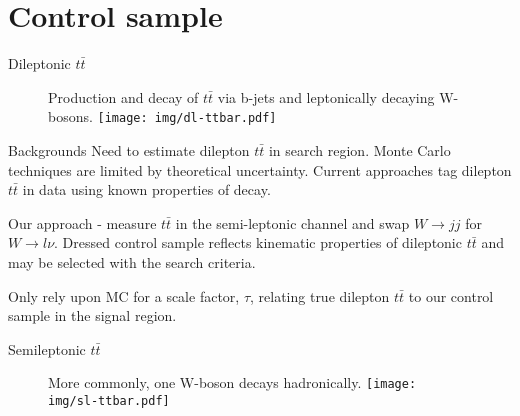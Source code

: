 \documentclass{beamer}
\begin{document}
%
%

\section{Control sample}

\begin{frame}{Dileptonic $t\bar{t}$}
  \begin{figure}
    \centering
    Production and decay of $t\bar{t}$ via b-jets and leptonically decaying W-bosons.
    \texttt{[image: img/dl-ttbar.pdf]}
  \end{figure}
\end{frame}

\begin{frame}{Backgrounds}
Need to estimate dilepton $t\bar{t}$ in search region. Monte Carlo techniques are limited by theoretical uncertainty. Current approaches tag dilepton $t\bar{t}$ in data using known properties of decay.

Our approach - measure $t\bar{t}$ in the semi-leptonic channel and swap $W\rightarrow jj$ for $W\rightarrow l\nu$. Dressed control sample reflects kinematic properties of dileptonic $t\bar{t}$ and may be selected with the search criteria.

Only rely upon MC for a scale factor, $\tau$, relating true dilepton $t\bar{t}$ to our control sample in the signal region.
\end{frame}

\begin{frame}{Semileptonic $t\bar{t}$}
  \begin{figure}
    \centering
    More commonly, one W-boson decays hadronically.
    \texttt{[image: img/sl-ttbar.pdf]}
  \end{figure}
\end{frame}
\end{document}
